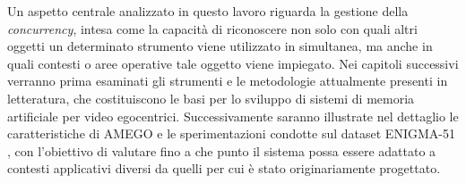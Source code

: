Un aspetto centrale analizzato in questo lavoro riguarda la gestione della \emph{concurrency}, intesa come la capacità di riconoscere non solo con quali altri oggetti un determinato strumento viene utilizzato in simultanea, ma anche in quali contesti o aree operative tale oggetto viene impiegato.
Nei capitoli successivi verranno prima esaminati gli strumenti e le metodologie attualmente presenti in letteratura, che costituiscono le basi per lo sviluppo di sistemi di memoria artificiale per video egocentrici. Successivamente saranno illustrate nel dettaglio le caratteristiche di AMEGO \cite{goletto2024amego} e le sperimentazioni condotte sul dataset ENIGMA-51 \cite{ragusa2023enigma51}, con l'obiettivo di valutare fino a che punto il sistema possa essere adattato a contesti applicativi diversi da quelli per cui è stato originariamente progettato.